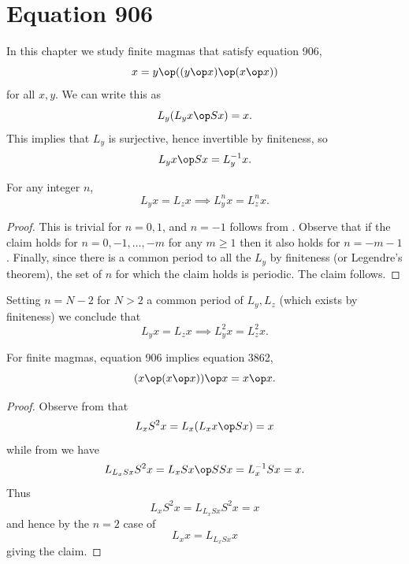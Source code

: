 \chapter{Equation 906}\label{906-chapter}

In this chapter we study finite magmas that satisfy equation 906,
\begin{equation}\label{906}
  x = y \op ((y \op x) \op (x \op x))
\end{equation}
for all $x,y$.  We can write this as
\begin{equation}\label{906-a}
  L_y (L_y x \op Sx) = x.
\end{equation}
This implies that $L_y$ is surjective, hence invertible by finiteness, so
\begin{equation}\label{906-b}
   L_y x \op Sx = L_y^{-1} x.
\end{equation}

\begin{corollary}\label{edge-disjoint}  For any integer $n$,
$$ L_y x = L_z x \implies L_y^{n} x = L_z^{n} x.$$
\end{corollary}

\begin{proof}  This is trivial for $n=0,1$, and $n=-1$ follows from .  Observe that if the claim holds for $n=0,-1,\dots,-m$ for any $m \geq 1$ then it also holds for $n=-m-1$.  Finally, since there is a common period to all the $L_y$ by finiteness (or Legendre's theorem), the set of $n$ for which the claim holds is periodic.  The claim follows.
\end{proof}
Setting $n = N-2$ for $N>2$ a common period of $L_y,L_z$ (which exists by finiteness) we conclude that
\begin{equation}\label{lyzx}
  L_y x = L_z x \implies L_y^2 x = L_z^2 x.
\end{equation}

\begin{theorem}\label{906-3862}  \leanok For finite magmas, equation 906 implies
equation 3862,
\begin{equation}\label{3862}
    (x \op (x \op x)) \op x = x \op x.
\end{equation}
\end{theorem}

\begin{proof} \leanok Observe from  that
$$ L_x S^2 x = L_x (L_x x \op Sx) = x$$
while from  we have
$$ L_{L_x Sx} S^2 x = L_x Sx \op S S x = L_x^{-1} Sx = x.$$
Thus
$$ L_x S^2 x = L_{L_x Sx} S^2 x = x$$
and hence by the $n=2$ case of 
$$ L_x x = L_{L_x Sx} x$$
giving the claim.
\end{proof}


